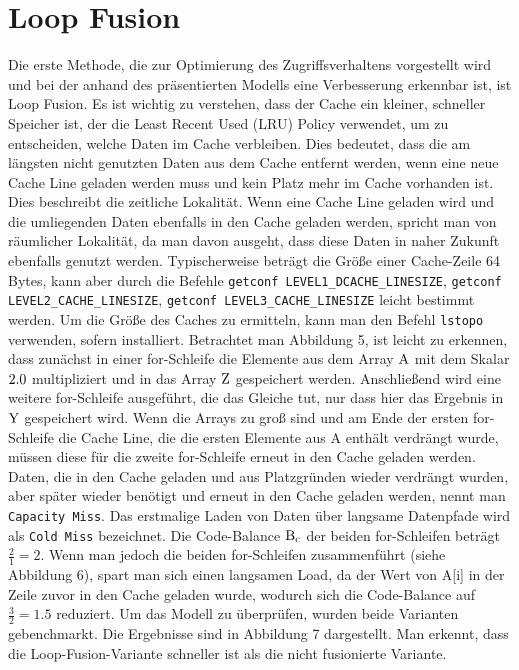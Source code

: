 \documentclass[sigconf,language=ngerman]{acmart}
\begin{document}
\section{Loop Fusion} 
    Die erste Methode, die zur Optimierung des Zugriffsverhaltens vorgestellt 
    wird und bei der anhand des präsentierten Modells eine Verbesserung erkennbar ist, 
    ist Loop Fusion. Es ist wichtig zu verstehen, dass der Cache ein kleiner, 
    schneller Speicher ist, der die Least Recent Used (LRU) Policy verwendet, um zu entscheiden, 
    welche Daten im Cache verbleiben. Dies bedeutet, 
    dass die am längsten nicht genutzten Daten aus dem Cache entfernt werden, 
    wenn eine neue Cache Line geladen werden muss und kein Platz mehr im Cache vorhanden ist. 
    Dies beschreibt die zeitliche Lokalität. 
    Wenn eine Cache Line geladen wird und die umliegenden Daten ebenfalls in den Cache geladen werden, 
    spricht man von räumlicher Lokalität, da man davon ausgeht, 
    dass diese Daten in naher Zukunft ebenfalls genutzt werden. 
    Typischerweise beträgt die Größe einer Cache-Zeile 64 Bytes, 
    kann aber durch die Befehle \texttt{getconf LEVEL1\_DCACHE\_LINESIZE}, 
    \texttt{getconf LEVEL2\_CACHE\_LINESIZE},
    \texttt{getconf LEVEL3\_CACHE\_LINESIZE} 
    leicht bestimmt werden. Um die Größe des Caches zu ermitteln, 
    kann man den Befehl \texttt{lstopo} verwenden, sofern installiert. 
    Betrachtet man Abbildung 5, ist %
    leicht zu erkennen, dass zunächst in einer for-Schleife die Elemente aus dem Array 
    $\textnormal{A}$ mit dem Skalar $\textnormal{2.0}$ 
    multipliziert und in das Array $\textnormal{Z}$ gespeichert werden. 
    Anschließend wird eine weitere for-Schleife ausgeführt, die das Gleiche tut, 
    nur dass hier das Ergebnis in $\textnormal{Y}$ gespeichert wird. 
    Wenn die Arrays zu groß sind und am Ende der ersten for-Schleife die Cache Line, 
    die die ersten Elemente aus A enthält verdrängt wurde, 
    müssen diese für die zweite for-Schleife erneut in den Cache geladen werden. 
    Daten, die in den Cache geladen und aus Platzgründen wieder verdrängt wurden, 
    aber später wieder benötigt und erneut in den Cache geladen werden, nennt man 
    \texttt{Capacity Miss}. Das erstmalige Laden von Daten über langsame Datenpfade wird als 
    \texttt{Cold Miss} bezeichnet. Die Code-Balance $\textnormal{B}_{\textnormal{c}}$ 
    der beiden for-Schleifen beträgt $\frac{2}{1} = 2$. Wenn man jedoch die beiden 
    for-Schleifen zusammenführt (siehe Abbildung 6), spart man sich einen langsamen Load, %
    da der Wert von A[i] in der Zeile zuvor in den Cache geladen wurde, 
    wodurch sich die Code-Balance auf $\frac{3}{2} = 1.5$ reduziert. 
    Um das Modell zu überprüfen, wurden beide Varianten gebenchmarkt. 
    Die Ergebnisse sind in Abbildung 7 dargestellt. Man erkennt, %
    dass die Loop-Fusion-Variante schneller ist als die nicht fusionierte Variante.
\end{document}
